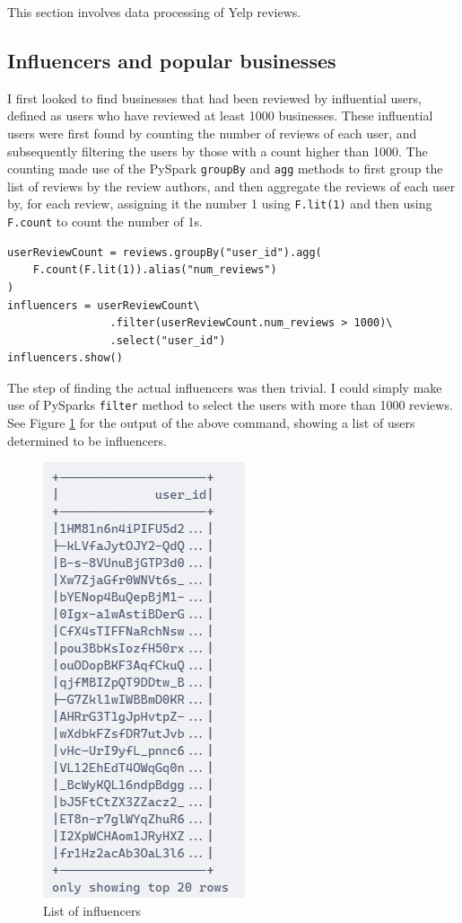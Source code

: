 This section involves data processing of Yelp reviews.

\subsection{Influencers and popular businesses}
I first looked to find businesses that had been reviewed by influential users, defined as users who have reviewed at least 1000 businesses. These influential users were first found by counting the number of reviews of each user, and subsequently filtering the users by those with a count higher than 1000. The counting made use of the PySpark \texttt{groupBy} and \texttt{agg} methods to first group the list of reviews by the review authors, and then aggregate the reviews of each user by, for each review, assigning it the number 1 using \texttt{F.lit(1)} and then using \texttt{F.count} to count the number of 1s.

\begin{verbatim}
userReviewCount = reviews.groupBy("user_id").agg(
    F.count(F.lit(1)).alias("num_reviews")
)
influencers = userReviewCount\
                .filter(userReviewCount.num_reviews > 1000)\
                .select("user_id")
influencers.show()
\end{verbatim}

The step of finding the actual influencers was then trivial. I could simply make use of PySparks \texttt{filter} method to select the users with more than 1000 reviews.
See Figure \ref{fig:influencers} for the output of the above command, showing a list of users determined to be influencers.

\begin{figure}
    \centering
    \includegraphics[width=0.3\linewidth]{images/influencers.png}
    \caption{List of influencers}
    \label{fig:influencers}
\end{figure}

